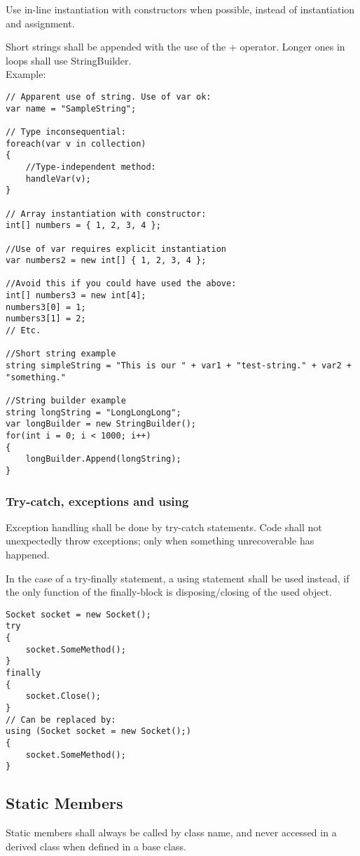 Use in-line instantiation with constructors when possible, instead of instantiation and assignment.

Short strings shall be appended with the use of the + operator. Longer ones in loops shall use StringBuilder.\\

Example:
\begin{lstlisting}
// Apparent use of string. Use of var ok:
var name = "SampleString";

// Type inconsequential:
foreach(var v in collection)
{
	//Type-independent method:
	handleVar(v);
}

// Array instantiation with constructor:
int[] numbers = { 1, 2, 3, 4 };

//Use of var requires explicit instantiation
var numbers2 = new int[] { 1, 2, 3, 4 };

//Avoid this if you could have used the above:
int[] numbers3 = new int[4];
numbers3[0] = 1;
numbers3[1] = 2;
// Etc.

//Short string example
string simpleString = "This is our " + var1 + "test-string." + var2 + "something."

//String builder example
string longString = "LongLongLong";
var longBuilder = new StringBuilder();
for(int i = 0; i < 1000; i++)
{
	longBuilder.Append(longString);
}

\end{lstlisting}


\subsubsection{Try-catch, exceptions and using}
Exception handling shall be done by try-catch statements.
Code shall not unexpectedly throw exceptions; only when something unrecoverable has happened.

In the case of a try-finally statement, a using statement shall be used instead, if the only function of
the finally-block is disposing/closing of the used object.
\\
\begin{lstlisting}
Socket socket = new Socket();
try
{
	socket.SomeMethod();
}
finally
{
	socket.Close();
}
// Can be replaced by:
using (Socket socket = new Socket();)
{
	socket.SomeMethod();
}
\end{lstlisting}

\subsection{Static Members}
Static members shall always be called by class name, and never accessed in a derived class when defined in a base class.

